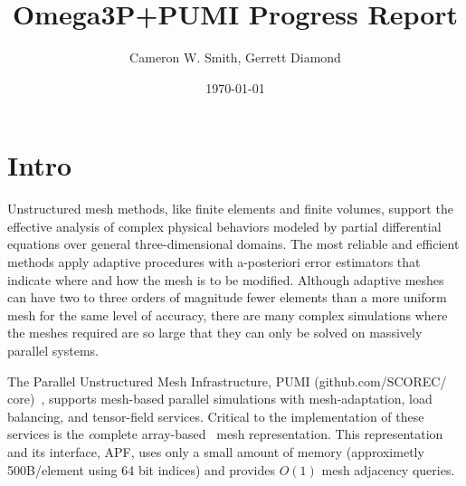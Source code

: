 \documentclass[a4paper]{article}
\title{Omega3P+PUMI Progress Report}
\author{Cameron W. Smith, Gerrett Diamond}
\date{\today}
\begin{document}
\maketitle
\section{Intro}

Unstructured mesh methods, like finite elements and finite volumes, support the
effective analysis of complex physical behaviors modeled by partial differential
equations over general three-dimensional domains.
The most reliable and efficient methods apply adaptive procedures with
a-posteriori error estimators that indicate where and how the mesh is to be
modified.
Although adaptive meshes can have two to three orders of magnitude fewer
elements than a more uniform mesh for the same level of accuracy, there are many
complex simulations where the meshes required are so large that they can only be
solved on massively parallel systems.

The Parallel Unstructured Mesh Infrastructure, PUMI
{\small (github.com/SCOREC/\\core)}~\cite{ibanez2015pumi},
supports mesh-based parallel simulations with mesh-adaptation, load balancing,
and tensor-field services.
Critical to the implementation of these services is the {\textit complete}
array-based~\cite{ibanezArray16} mesh representation.
This representation and its interface, APF, uses only a small amount of memory
(approximetly 500B/element using 64 bit indices) and provides $O(1)$ mesh
adjacency queries.
\end{document}
